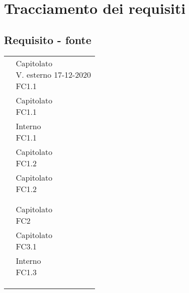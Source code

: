 {{{\section{Tracciamento dei requisiti}\label{RequisitiTracciamentoDeiRequisiti}

\subsection{Requisito - fonte}\label{RequisitiTracciamentoDeiRequisitiFonte}
\def\tabularxcolumn#1{m{#1}}
{
	\begin{center}
		\renewcommand{\arraystretch}{1.4}
		\begin{longtable}{|p{7.5cm}|p{7.5cm}|}
		\hline
		\rowcolor{airforceblue}
		\makecell[c]{\textbf{Codice RS}} & \makecell[c]{\textbf{Fonte}}  \\
		\hline
		\makecell[c]{RSFO1} & \makecell[c]{Capitolato\\V. esterno 17-12-2020 \\ FC1.1} \\
		\hline
		\makecell[c]{RSFF2} & \makecell[c]{Capitolato \\ FC1.1}\\
		\hline
		\makecell[c]{RSFO3} & \makecell[c]{Interno\\FC1.1}\\
		\hline
		\makecell[c]{RSFO4.1} & \makecell[c]{Capitolato\\FC1.2}\\
		\hline
		\makecell[c]{RSFO4.2} & \makecell[c]{Capitolato\\FC1.2}\\
		\hline
		\makecell[c]{RSFO5} & \makecell[c]{Capitolato}\\
		\hline
		\makecell[c]{RSFO5.1} & \makecell[c]{Capitolato}\\
		\hline
		\makecell[c]{RSFD6 }& \makecell[c]{Capitolato \\ FC2}\\
		\hline
		\makecell[c]{RSFO7} & \makecell[c]{Capitolato\\FC3.1}\\
		\hline
		\makecell[c]{RSFO8} & \makecell[c]{Interno \\FC1.3}\\
		\hline
		\makecell[c]{RSPO1} & \makecell[c]{Capitolato}\\
		\hline
		\makecell[c]{RSPO2} & \makecell[c]{Capitolato}\\
		\hline
		\makecell[c]{RSQO1} & \makecell[c]{Interno}\\

\end{longtable}
\end{center}}}}}
